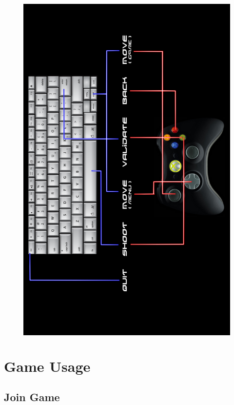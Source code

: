 \documentclass{koala-fr}
\begin{document}
\newpage
\begin{figure}[H]
      \begin{center}
        \includegraphics[width=15cm]{help.png}
      \end{center}
    \end{figure}

\chapter{Game Usage}

\section{Join Game}
\end{document}
